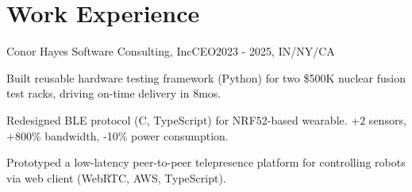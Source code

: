 \documentclass[letterpaper,10pt]{article}
\begin{document}
\section{Work Experience}

\begin{joblong}{Conor Hayes Software Consulting, Inc}{CEO}{2023 - 2025, IN/NY/CA}
\item Built reusable hardware testing framework (Python) for two \$500K nuclear fusion test racks, driving on-time delivery in 8mos.
\item Redesigned BLE protocol (C, TypeScript) for NRF52-based wearable. +2 sensors, +800\% bandwidth, -10\% power consumption.
\item Prototyped a low-latency peer-to-peer telepresence platform for controlling robots via web client (WebRTC, AWS, TypeScript).
\end{joblong}%
\end{document}

